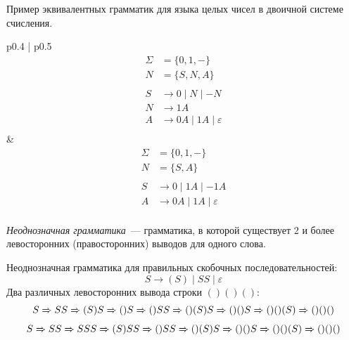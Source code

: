 \begin{example}  Пример эквивалентных грамматик для языка целых чисел в двоичной системе счисления.

    \begin{tabular}{p{} | p{}}
        \[
            \begin{aligned}
                \Sigma & = \{ 0, 1, - \}                            \\
                N      & = \{ S, N, A \}                            \\~\\
                S      & \rightarrow 0 \mid N \mid - N              \\
                N      & \rightarrow 1 A                            \\
                A      & \rightarrow 0 A \mid 1 A  \mid \varepsilon \\
            \end{aligned}
        \]
         &
        \[
            \begin{aligned}
                \Sigma & = \{ 0, 1, - \}                            \\
                N      & = \{ S, A \}                               \\~\\
                S      & \rightarrow 0 \mid 1 A  \mid - 1 A         \\
                A      & \rightarrow 0 A \mid 1 A  \mid \varepsilon \\
            \end{aligned}
        \]
    \end{tabular}

\end{example}


\begin{definition}
    \emph{Неоднозначная грамматика}~--- грамматика, в которой существует 2 и более левосторонних (правосторонних) выводов для одного слова.
\end{definition}

\begin{example}
    Неоднозначная грамматика для правильных скобочных последовательностей:
    \[
        S \to (S) \mid S S \mid \varepsilon
    \]
    Два различных левосторонних вывода строки $()()()$:
    \begin{gather*}
        S \derives[] S S \derives [] (S) S \derives[] () S \derives[] () S S \derives[] () (S) S \derives[] () () S \derives[] () () (S) \derives[] () () ()\\
        S \derives[] S S \derives[] S S S \derives[] (S) S S \derives[] () S S \derives[] () (S) S \derives[] () () S \derives[] () () (S) \derives[] () () ()
    \end{gather*}
\end{example}

